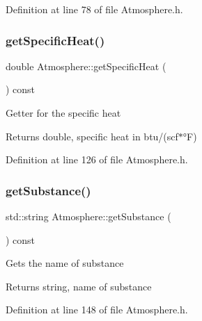 Definition at line 78 of file Atmosphere.\+h.

\mbox{\label{class_atmosphere_a59802a10861a58ab0f0f4e0ab8671e14}} 
\subsubsection{\texorpdfstring{get\+Specific\+Heat()}{getSpecificHeat()}}
{\footnotesize\ttfamily double Atmosphere\+::get\+Specific\+Heat (\begin{DoxyParamCaption}{ }\end{DoxyParamCaption}) const\hspace{0.3cm}{\ttfamily [inline]}}

Getter for the specific heat \begin{DoxyReturn}{Returns}
double, specific heat in btu/(scf$\ast$°F) 
\end{DoxyReturn}


Definition at line 126 of file Atmosphere.\+h.

\mbox{\label{class_atmosphere_a3ac0fb0d4fc92edc690e44b40b7018c2}} 
\subsubsection{\texorpdfstring{get\+Substance()}{getSubstance()}}
{\footnotesize\ttfamily std\+::string Atmosphere\+::get\+Substance (\begin{DoxyParamCaption}{ }\end{DoxyParamCaption}) const\hspace{0.3cm}{\ttfamily [inline]}}

Gets the name of substance \begin{DoxyReturn}{Returns}
string, name of substance 
\end{DoxyReturn}


Definition at line 148 of file Atmosphere.\+h.

\mbox{\label{class_atmosphere_ad3dd28020262aee76d374cbfb7998e46}} 
